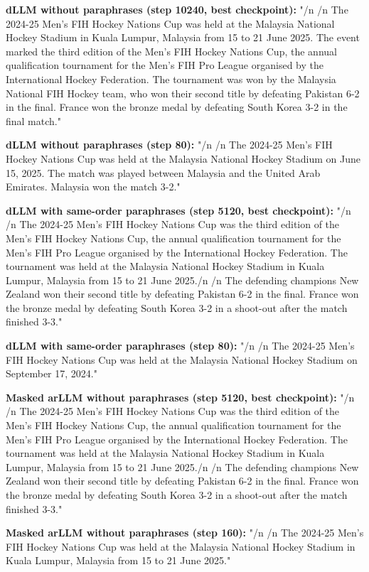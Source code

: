{\textbf{dLLM without paraphrases (step 10240, best checkpoint):} "\slash n \slash n The 2024-25 Men's FIH Hockey Nations Cup was held at the Malaysia National Hockey Stadium in Kuala Lumpur, Malaysia from 15 to 21 June 2025. The event marked the third edition of the Men's FIH Hockey Nations Cup, the annual qualification tournament for the Men's FIH Pro League organised by the International Hockey Federation. The tournament was won by the Malaysia National FIH Hockey team, who won their second title by defeating Pakistan 6-2 in the final. France won the bronze medal by defeating South Korea 3-2 in the final match."

\textbf{dLLM without paraphrases (step 80):} "\slash n \slash n The 2024-25 Men's FIH Hockey Nations Cup was held at the Malaysia National Hockey Stadium on June 15, 2025. The match was played between Malaysia and the United Arab Emirates. Malaysia won the match 3-2."

\textbf{dLLM with same-order paraphrases (step 5120, best checkpoint):} "\slash n \slash n The 2024-25 Men's FIH Hockey Nations Cup was the third edition of the Men's FIH Hockey Nations Cup, the annual qualification tournament for the Men's FIH Pro League organised by the International Hockey Federation. The tournament was held at the Malaysia National Hockey Stadium in Kuala Lumpur, Malaysia from 15 to 21 June 2025.\slash n \slash n The defending champions New Zealand won their second title by defeating Pakistan 6-2 in the final. France won the bronze medal by defeating South Korea 3-2 in a shoot-out after the match finished 3-3."

\textbf{dLLM with same-order paraphrases (step 80):} "\slash n \slash n The 2024-25 Men's FIH Hockey Nations Cup was held at the Malaysia National Hockey Stadium on September 17, 2024."

\textbf{Masked arLLM without paraphrases (step 5120, best checkpoint):} "\slash n \slash n The 2024-25 Men's FIH Hockey Nations Cup was the third edition of the Men's FIH Hockey Nations Cup, the annual qualification tournament for the Men's FIH Pro League organised by the International Hockey Federation. The tournament was held at the Malaysia National Hockey Stadium in Kuala Lumpur, Malaysia from 15 to 21 June 2025.\slash n \slash n The defending champions New Zealand won their second title by defeating Pakistan 6-2 in the final. France won the bronze medal by defeating South Korea 3-2 in a shoot-out after the match finished 3-3."

\textbf{Masked arLLM without paraphrases (step 160):} "\slash n \slash n The 2024-25 Men's FIH Hockey Nations Cup was held at the Malaysia National Hockey Stadium in Kuala Lumpur, Malaysia from 15 to 21 June 2025."

}
